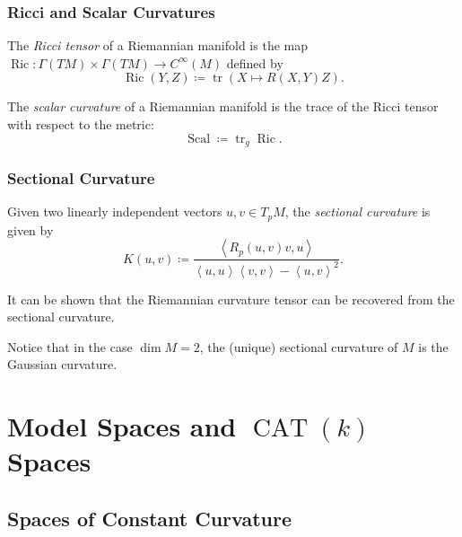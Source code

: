 \documentclass{beamer}
\DeclareMathOperator{\trace}{tr}
\DeclareMathOperator{\Ric}{Ric}
\DeclareMathOperator{\Scal}{Scal}
\DeclareMathOperator{\CAT}{CAT}
\newcommand{\inprod}[2]{\left\langle #1, #2 \right\rangle}
\theoremstyle{definition}
\begin{document}
\begin{frame}
    \frametitle{Ricci and Scalar Curvatures}

    \begin{definition}
        The \emph{Ricci tensor} of a Riemannian manifold is the map
        $\Ric : \Gamma(TM) \times \Gamma(TM) \to C^\infty(M)$ defined by
        \[
            \Ric(Y,Z) \coloneqq \trace(X \mapsto R(X,Y)Z).
        \]
    \end{definition}

    \begin{definition}
        The \emph{scalar curvature} of a Riemannian manifold is the trace of the
        Ricci tensor with respect to the metric:
        \[
          \Scal \coloneqq \trace_g \Ric.
        \]
    \end{definition}
\end{frame}

\begin{frame}
    \frametitle{Sectional Curvature}

    \begin{definition}
        Given two linearly independent vectors $u, v \in T_pM$, the \emph{sectional curvature}
        is given by
        \[
            K(u,v) \coloneqq \frac{\inprod{R_p(u,v)v}{u}}{\inprod{u}{u}\inprod{v}{v} - \inprod{u}{v}^2}.
        \]
    \end{definition}

    It can be shown that the Riemannian curvature tensor can be recovered from the
    sectional curvature.

    Notice that in the case $\dim M = 2$, the (unique) sectional curvature of $M$ is the
    Gaussian curvature.

\end{frame}

\section{Model Spaces and $\CAT(k)$ Spaces}

\subsection{Spaces of Constant Curvature}
\end{document}

